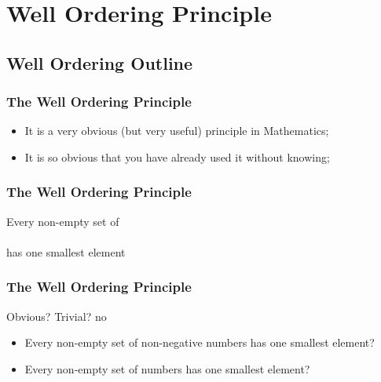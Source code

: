 \section{Well Ordering Principle}

\frame{\tableofcontents[currentsection,hideallsubsections, firstsection=2, sections={2-5}]}

\subsection{Well Ordering Outline}

\begin{frame}
  \frametitle{The Well Ordering Principle}

  \begin{itemize}
  \item It is a very obvious (but very useful) principle in Mathematics;
    \bigskip

  \item It is so obvious that you have already used it without knowing;
  \end{itemize}

\end{frame}

\begin{frame}
  \frametitle{The Well Ordering Principle}

  {\Large
  \begin{center}
    Every non-empty set of\\
    \\
    has one \alert{smallest element}
  \end{center}}
\end{frame}

\begin{frame}
  \frametitle{The Well Ordering Principle}
  \begin{center}
    Obvious?  \hspace{2cm} Trivial? \alert{no}
  \end{center}
  \vfill

  \begin{itemize}
  \item Every non-empty set of non-negative 
    numbers has one smallest element?

    \bigskip

  \item Every non-empty set of  numbers has one
    smallest element?
  \end{itemize}
\end{frame}

